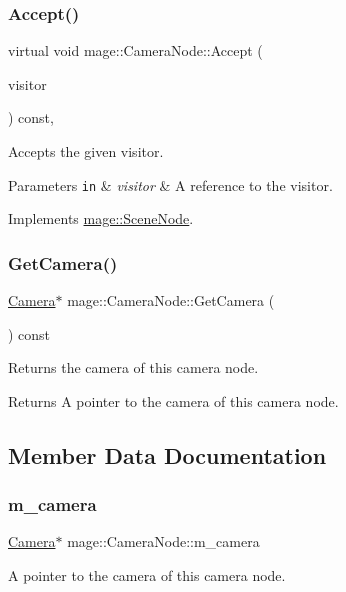 \subsubsection{\texorpdfstring{Accept()}{Accept()}\hspace{0.1cm}{\footnotesize\ttfamily [2/2]}}
{\footnotesize\ttfamily virtual void mage\+::\+Camera\+Node\+::\+Accept (\begin{DoxyParamCaption}\item[{\hyperlink{classmage_1_1_scene_node_visitor}{Scene\+Node\+Visitor} \&}]{visitor }\end{DoxyParamCaption}) const\hspace{0.3cm}{\ttfamily [override]}, {\ttfamily [virtual]}}

Accepts the given visitor.


\begin{DoxyParams}[1]{Parameters}
\mbox{\tt in}  & {\em visitor} & A reference to the visitor. \\
\hline
\end{DoxyParams}


Implements \hyperlink{classmage_1_1_scene_node_a35fbfd49185fb61cb4e9edf56af35262}{mage\+::\+Scene\+Node}.

\hypertarget{classmage_1_1_camera_node_a7cd05fd41271259870483de5b3ed6ebe}{}\label{classmage_1_1_camera_node_a7cd05fd41271259870483de5b3ed6ebe} 
\subsubsection{\texorpdfstring{Get\+Camera()}{GetCamera()}}
{\footnotesize\ttfamily \hyperlink{classmage_1_1_camera}{Camera}$\ast$ mage\+::\+Camera\+Node\+::\+Get\+Camera (\begin{DoxyParamCaption}{ }\end{DoxyParamCaption}) const}

Returns the camera of this camera node.

\begin{DoxyReturn}{Returns}
A pointer to the camera of this camera node. 
\end{DoxyReturn}


\subsection{Member Data Documentation}
\hypertarget{classmage_1_1_camera_node_aee902112c2e70e8de69b69aed303ca1f}{}\label{classmage_1_1_camera_node_aee902112c2e70e8de69b69aed303ca1f} 
\subsubsection{\texorpdfstring{m\+\_\+camera}{m\_camera}}
{\footnotesize\ttfamily \hyperlink{classmage_1_1_camera}{Camera}$\ast$ mage\+::\+Camera\+Node\+::m\+\_\+camera\hspace{0.3cm}{\ttfamily [protected]}}

A pointer to the camera of this camera node. 